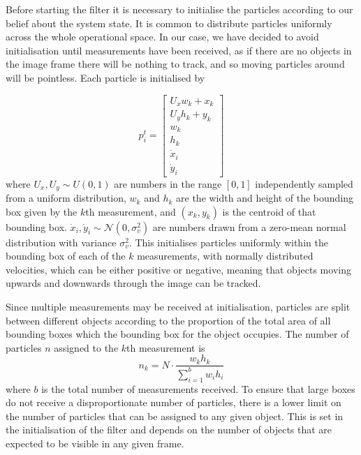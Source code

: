 \documentclass[conference]{IEEEtran}
\begin{document}
Before starting the filter it is necessary to initialise the particles according
to our belief about the system state. It is common to distribute particles
uniformly across the whole operational space. In our case, we have decided to
avoid initialisation until measurements have been received, as if there are no
objects in the image frame there will be nothing to track, and so moving
particles around will be pointless. Each particle is initialised by

\begin{equation}
  p_i^t=
  \begin{bmatrix}
    U_xw_k + x_k\\
    U_yh_k + y_k\\
    w_k\\
    h_k\\
    \dot{x}_i\\
    \dot{y}_i
  \end{bmatrix}
\end{equation}
where $U_x,U_y\sim U(0,1)$ are numbers in the range $[0,1]$ independently
sampled from a uniform distribution, $w_k$ and $h_k$ are the width and height of
the bounding box given by the $k$th measurement, and $(x_k,y_k)$ is the centroid
of that bounding box. $\dot{x}_i,\dot{y}_i\sim\mathcal{N}(0,\sigma_v^2)$ are
numbers drawn from a zero-mean normal distribution with variance
$\sigma_v^2$. This initialises particles uniformly within the bounding box of
each of the $k$ measurements, with normally distributed velocities, which can be
either positive or negative, meaning that objects moving upwards and downwards
through the image can be tracked.

Since multiple measurements may be received at initialisation,
particles are split between different objects according to the proportion of the
total area of all bounding boxes which the bounding box for the object
occupies. The number of particles $n$ assigned to the $k$th measurement is
\begin{equation}
  n_k=N\cdot\frac{w_kh_k}{\sum_{i=1}^bw_ih_i}
\end{equation}
where $b$ is the total number of measurements received. To ensure that large
boxes do not receive a disproportionate number of particles, there is a lower
limit on the number of particles that can be assigned to any given object. This
is set in the initialisation of the filter and depends on the number of objects
that are expected to be visible in any given frame.
\end{document}
